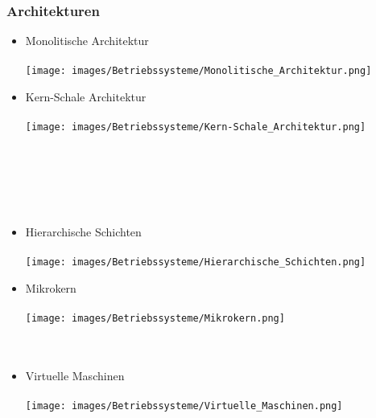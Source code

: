 \subsubsection{Architekturen}
\begin{minipage}{0.3\textwidth}
    \begin{itemize}
        \item Monolitische Architektur\\\\ \texttt{[image: images/Betriebssysteme/Monolitische\_Architektur.png]}
        \item Kern-Schale Architektur\\\\
        \texttt{[image: images/Betriebssysteme/Kern-Schale\_Architektur.png]} \\ \\ \\ \\ \\ \\
    \end{itemize}
\end{minipage}
\hfill
\begin{minipage}{0.3\textwidth}        
    \begin{itemize}
        \item Hierarchische Schichten\\\\
        \texttt{[image: images/Betriebssysteme/Hierarchische\_Schichten.png]}
        \item Mikrokern\\\\
        \texttt{[image: images/Betriebssysteme/Mikrokern.png]} \\ \\ \\
    \end{itemize}
\end{minipage}
\hfill
\begin{minipage}{0.3\textwidth}
    \begin{itemize}
        \item Virtuelle Maschinen\\\\
        \texttt{[image: images/Betriebssysteme/Virtuelle\_Maschinen.png]} \\ \\ \\ \\ \\ \\ \\ \\ \\ \\ \\ \\ \\
    \end{itemize}
\end{minipage}

